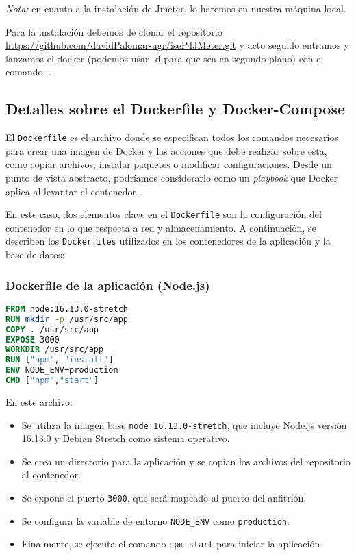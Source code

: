 \textit{Nota:} en cuanto a la instalación de Jmeter, lo haremos en nuestra máquina local.

Para la instalación debemos de clonar el repositorio \url{https://github.com/davidPalomar-ugr/iseP4JMeter.git} y acto seguido entramos y lanzamos el docker (podemos usar -d para que sea en segundo plano) con el comando: .

\subsection{Detalles sobre el Dockerfile y Docker-Compose}

El \texttt{Dockerfile} es el archivo donde se especifican todos los comandos necesarios para crear una imagen de Docker y las acciones que debe realizar sobre esta, como copiar archivos, instalar paquetes o modificar configuraciones. Desde un punto de vista abstracto, podríamos considerarlo como un \textit{playbook} que Docker aplica al levantar el contenedor.

En este caso, dos elementos clave en el \texttt{Dockerfile} son la configuración del contenedor en lo que respecta a red y almacenamiento. A continuación, se describen los \texttt{Dockerfiles} utilizados en los contenedores de la aplicación y la base de datos:

\subsubsection{Dockerfile de la aplicación (Node.js)}


\begin{lstlisting}[language=Dockerfile]
FROM node:16.13.0-stretch
RUN mkdir -p /usr/src/app
COPY . /usr/src/app
EXPOSE 3000
WORKDIR /usr/src/app
RUN ["npm", "install"]
ENV NODE_ENV=production
CMD ["npm","start"]
\end{lstlisting}

En este archivo:
\begin{itemize}
    \item Se utiliza la imagen base \texttt{node:16.13.0-stretch}, que incluye Node.js versión 16.13.0 y Debian Stretch como sistema operativo.
    \item Se crea un directorio para la aplicación y se copian los archivos del repositorio al contenedor.
    \item Se expone el puerto \texttt{3000}, que será mapeado al puerto del anfitrión.
    \item Se configura la variable de entorno \texttt{NODE\_ENV} como \texttt{production}.
    \item Finalmente, se ejecuta el comando \texttt{npm start} para iniciar la aplicación.
\end{itemize}

